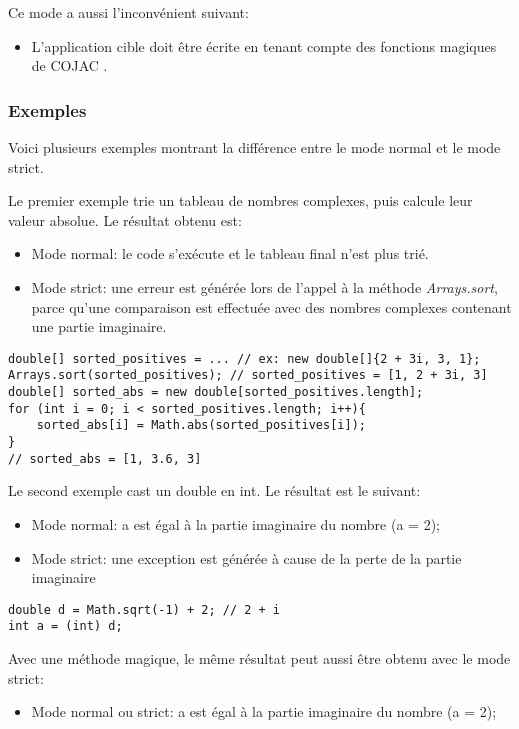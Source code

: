 Ce mode a aussi l'inconvénient suivant:
\begin{itemize}
    \item L'application cible doit être écrite en tenant compte des fonctions magiques de COJAC \cite{COJAC}.
\end{itemize}

\subsubsection{Exemples}

Voici plusieurs exemples montrant la différence entre le mode normal et le mode strict.

Le premier exemple trie un tableau de nombres complexes, puis calcule leur valeur absolue. Le résultat obtenu est:
\begin{itemize}
    \item Mode normal: le code s'exécute et le tableau final n'est plus trié.
    \item Mode strict: une erreur est générée lors de l'appel à la méthode \textit{Arrays.sort}, parce qu'une comparaison est effectuée avec des nombres complexes contenant une partie imaginaire.
\end{itemize}

\begin{verbatim}
double[] sorted_positives = ... // ex: new double[]{2 + 3i, 3, 1};
Arrays.sort(sorted_positives); // sorted_positives = [1, 2 + 3i, 3]
double[] sorted_abs = new double[sorted_positives.length];
for (int i = 0; i < sorted_positives.length; i++){
    sorted_abs[i] = Math.abs(sorted_positives[i]);
}
// sorted_abs = [1, 3.6, 3]
\end{verbatim}

Le second exemple cast un double en int. Le résultat est le suivant:
\begin{itemize}
    \item Mode normal: a est égal à la partie imaginaire du nombre (a = 2);
    \item Mode strict: une exception est générée à cause de la perte de la partie imaginaire
\end{itemize}

\begin{verbatim}
double d = Math.sqrt(-1) + 2; // 2 + i
int a = (int) d;
\end{verbatim}

Avec une méthode magique, le même résultat peut aussi être obtenu avec le mode strict:
\begin{itemize}
    \item Mode normal ou strict: a est égal à la partie imaginaire du nombre (a = 2);
\end{itemize}

